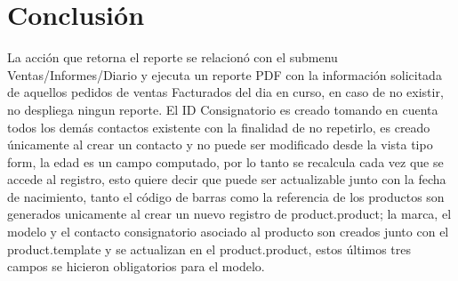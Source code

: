 \documentclass[11pt,letterpaper]{article}
\begin{document}
\section{Conclusión}

	La acción que retorna el reporte se relacionó con el submenu Ventas/Informes/Diario y ejecuta un reporte PDF con la información solicitada de aquellos pedidos de ventas Facturados del dia en curso, en caso de no existir, no despliega ningun reporte. El ID Consignatorio es creado tomando en cuenta todos los demás contactos existente con la finalidad de no repetirlo, es creado únicamente al crear un contacto y no puede ser modificado desde la vista tipo form, la edad es un campo computado, por lo tanto se recalcula cada vez que se accede al registro, esto quiere decir que puede ser actualizable junto con la fecha de nacimiento, tanto el código de barras como la referencia de los productos son generados unicamente al crear un nuevo registro de product.product; la marca, el modelo y el contacto consignatorio asociado al producto son creados junto con el product.template y se actualizan en el product.product, estos últimos tres campos se hicieron obligatorios para el modelo.
\end{document}
